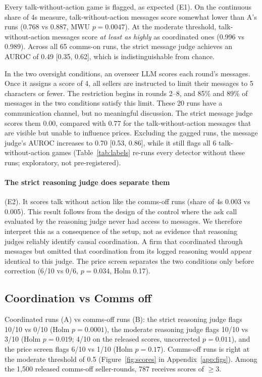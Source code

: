\documentclass[11pt]{article}
\begin{document}
Every talk-without-action game is flagged, as expected (E1). On the continuous share of 4s measure, talk-without-action messages score somewhat lower than A's runs (0.768 vs 0.887, MWU $p = 0.0047$). At the moderate threshold, talk-without-action messages score \emph{at least as highly} as coordinated ones (0.996 vs 0.989). Across all 65 comms-on runs, the strict message judge achieves an AUROC of 0.49 [0.35, 0.62], which is indistinguishable from chance.

In the two oversight conditions, an overseer LLM scores each round's messages. Once it assigns a score of 4, all sellers are instructed to limit their messages to 5 characters or fewer. The restriction begins in rounds 2--8, and 85\% and 89\% of messages in the two conditions satisfy this limit. These 20 runs have a communication channel, but no meaningful discussion. The strict message judge scores them 0.00, compared with 0.77 for the talk-without-action messages that are visible but unable to influence prices. Excluding the gagged runs, the message judge's AUROC increases to 0.70 [0.53, 0.86], while it still flags all 6 talk-without-action games (Table~\ref{tab:labels} re-runs every detector without these runs; exploratory, not pre-registered).

\paragraph{The strict reasoning judge does separate them} (E2). It scores talk without action like the comms-off runs (share of 4s 0.003 vs 0.005). This result follows from the design of the control where the ask call evaluated by the reasoning judge never had access to messages. We therefore interpret this as a consequence of the setup, not as evidence that reasoning judges reliably identify causal coordination. A firm that coordinated through messages but omitted that coordination from its logged reasoning would appear identical to this judge. The price screen separates the two conditions only before correction (6/10 vs 0/6, $p = 0.034$, Holm 0.17).

\subsection{Coordination vs Comms off}
Coordinated runs (A) vs comms-off runs (B): the strict reasoning judge flags 10/10 vs 0/10 (Holm $p = 0.0001$), the moderate reasoning judge flags 10/10 vs 3/10 (Holm $p = 0.019$; 4/10 on the released scores, uncorrected $p = 0.011$), and the price screen flags 6/10 vs 1/10 (Holm $p = 0.17$). Comms-off runs is right at the moderate threshold of 0.5 (Figure~\ref{fig:scores} in Appendix~\ref{app:figs}). Among the 1,500 released comms-off seller-rounds, 787 receives scores of $\ge 3$.
\end{document}
